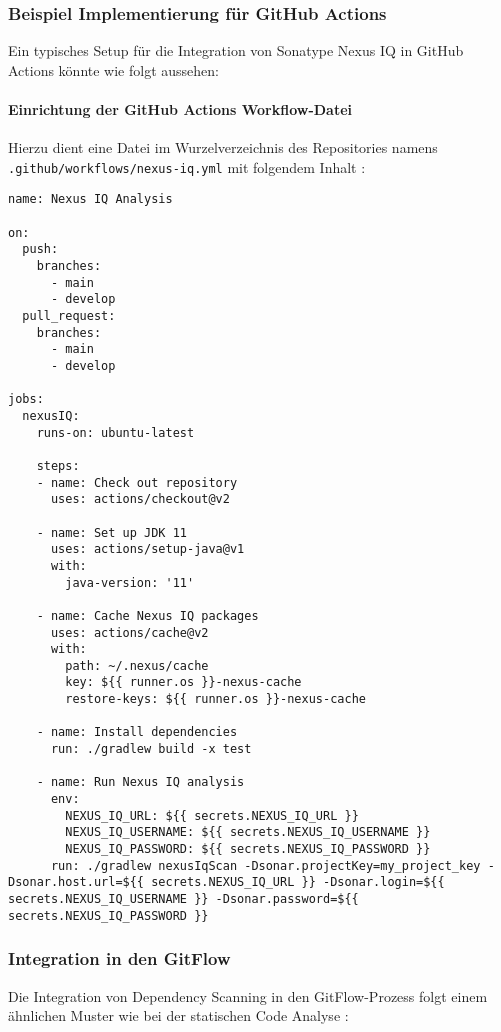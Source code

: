 \subsubsection{Beispiel Implementierung für GitHub Actions}

Ein typisches Setup für die Integration von Sonatype Nexus IQ in GitHub Actions könnte wie folgt aussehen:

\paragraph{Einrichtung der GitHub Actions Workflow-Datei}

Hierzu dient eine Datei im Wurzelverzeichnis des Repositories namens \texttt{.github/workflows/nexus-iq.yml} mit folgendem Inhalt \cite{GitHub2020}:

\begin{lstlisting}
name: Nexus IQ Analysis

on:
  push:
    branches:
      - main
      - develop
  pull_request:
    branches:
      - main
      - develop

jobs:
  nexusIQ:
    runs-on: ubuntu-latest

    steps:
    - name: Check out repository
      uses: actions/checkout@v2

    - name: Set up JDK 11
      uses: actions/setup-java@v1
      with:
        java-version: '11'

    - name: Cache Nexus IQ packages
      uses: actions/cache@v2
      with:
        path: ~/.nexus/cache
        key: ${{ runner.os }}-nexus-cache
        restore-keys: ${{ runner.os }}-nexus-cache

    - name: Install dependencies
      run: ./gradlew build -x test

    - name: Run Nexus IQ analysis
      env:
        NEXUS_IQ_URL: ${{ secrets.NEXUS_IQ_URL }}
        NEXUS_IQ_USERNAME: ${{ secrets.NEXUS_IQ_USERNAME }}
        NEXUS_IQ_PASSWORD: ${{ secrets.NEXUS_IQ_PASSWORD }}
      run: ./gradlew nexusIqScan -Dsonar.projectKey=my_project_key -Dsonar.host.url=${{ secrets.NEXUS_IQ_URL }} -Dsonar.login=${{ secrets.NEXUS_IQ_USERNAME }} -Dsonar.password=${{ secrets.NEXUS_IQ_PASSWORD }}
\end{lstlisting}

\subsubsection{Integration in den GitFlow}

Die Integration von Dependency Scanning in den GitFlow-Prozess folgt einem ähnlichen Muster wie bei der statischen Code Analyse \cite{Driessen2010b}:

